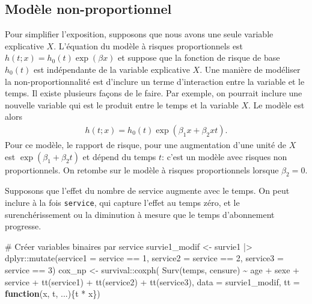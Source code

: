 \documentclass[
  11pt,
  letterpaper,
]{scrbook}
\newenvironment{Shaded}{\begin{snugshade}}{\end{snugshade}}
\newcommand{\AttributeTok}[1]{\textcolor[rgb]{0.40,0.45,0.13}{#1}}
\newcommand{\CommentTok}[1]{\textcolor[rgb]{0.37,0.37,0.37}{#1}}
\newcommand{\ControlFlowTok}[1]{\textcolor[rgb]{0.00,0.23,0.31}{\textbf{#1}}}
\newcommand{\DecValTok}[1]{\textcolor[rgb]{0.68,0.00,0.00}{#1}}
\newcommand{\FunctionTok}[1]{\textcolor[rgb]{0.28,0.35,0.67}{#1}}
\newcommand{\NormalTok}[1]{\textcolor[rgb]{0.00,0.23,0.31}{#1}}
\newcommand{\OtherTok}[1]{\textcolor[rgb]{0.00,0.23,0.31}{#1}}
\newcommand{\SpecialCharTok}[1]{\textcolor[rgb]{0.37,0.37,0.37}{#1}}
\theoremstyle{definition}
\theoremstyle{remark}
\begin{document}
\subsection{Modèle non-proportionnel}\label{moduxe8le-non-proportionnel}

Pour simplifier l'exposition, supposons que nous avons une seule
variable explicative \(X\). L'équation du modèle à risques
proportionnels est \(h(t; x) = h_0(t)\exp(\beta x)\) et suppose que la
fonction de risque de base \(h_0(t)\) est indépendante de la variable
explicative \(X\). Une manière de modéliser la non-proportionnalité est
d'inclure un terme d'interaction entre la variable et le temps. Il
existe plusieurs façons de le faire. Par exemple, on pourrait inclure
une nouvelle variable qui est le produit entre le temps et la variable
\(X\). Le modèle est alors \begin{align*}
h(t; x) = h_0(t) \exp(\beta_1x + \beta_2xt).
\end{align*} Pour ce modèle, le rapport de risque, pour une augmentation
d'une unité de \(X\) est \(\exp(\beta_1+ \beta_2t)\) et dépend du temps
\(t\): c'est un modèle avec risques non proportionnels. On retombe sur
le modèle à risques proportionnels lorsque \(\beta_2=0\).

Supposons que l'effet du nombre de service augmente avec le temps. On
peut inclure à la fois \texttt{service}, qui capture l'effet au temps
zéro, et le surenchérissement ou la diminution à mesure que le temps
d'abonnement progresse.

\begin{Shaded}
\begin{Highlighting}[]
\CommentTok{\# Créer variables binaires par service}
\NormalTok{survie1\_modif }\OtherTok{\textless{}{-}}\NormalTok{ survie1 }\SpecialCharTok{|\textgreater{}}
\NormalTok{  dplyr}\SpecialCharTok{::}\FunctionTok{mutate}\NormalTok{(}\AttributeTok{service1 =}\NormalTok{ service }\SpecialCharTok{==} \DecValTok{1}\NormalTok{,}
                \AttributeTok{service2 =}\NormalTok{ service }\SpecialCharTok{==} \DecValTok{2}\NormalTok{,}
                \AttributeTok{service3 =}\NormalTok{ service }\SpecialCharTok{==} \DecValTok{3}\NormalTok{)}
\NormalTok{cox\_np }\OtherTok{\textless{}{-}}\NormalTok{ survival}\SpecialCharTok{::}\FunctionTok{coxph}\NormalTok{(}
    \FunctionTok{Surv}\NormalTok{(temps, censure) }\SpecialCharTok{\textasciitilde{}} 
\NormalTok{     age }\SpecialCharTok{+}\NormalTok{ sexe }\SpecialCharTok{+}\NormalTok{ service }\SpecialCharTok{+} 
      \FunctionTok{tt}\NormalTok{(service1) }\SpecialCharTok{+} \FunctionTok{tt}\NormalTok{(service2) }\SpecialCharTok{+} \FunctionTok{tt}\NormalTok{(service3), }
     \AttributeTok{data =}\NormalTok{ survie1\_modif, }
     \AttributeTok{tt =} \ControlFlowTok{function}\NormalTok{(x, t, ...)\{t }\SpecialCharTok{*}\NormalTok{ x\})}
\end{Highlighting}
\end{Shaded}
\end{document}

